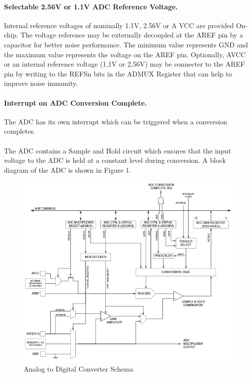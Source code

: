 \documentclass[english]{article}
\begin{document}
\paragraph{Selectable 2.56V or 1.1V ADC Reference Voltage.} Internal reference voltages of nominally 1.1V, 2.56V or A VCC are provided On-chip. The voltage reference may be externally decoupled at the AREF pin by a capacitor for better noise performance. The minimum value represents GND and the maximum value represents the voltage on the AREF pin. Optionally, AVCC or an internal reference voltage (1,1V or 2,56V) may be connecter to the AREF pin by writing to the REFSn bits in the ADMUX Register that can help to improve noise immunity.
\paragraph{Interrupt on ADC Conversion Complete.} The ADC has its own interrupt which can be triggered when a conversion completes.\\\\
The ADC contains a Sample and Hold circuit which ensures that the input voltage to the ADC is held at a constant level during conversion. A block diagram of the ADC is shown in Figure 1.
\begin{figure}[H]
\centerline{\includegraphics[scale=0.8]{MicroLab8/1}}
\caption{Analog to Digital Converter Schema}
\end{figure}
\end{document}
